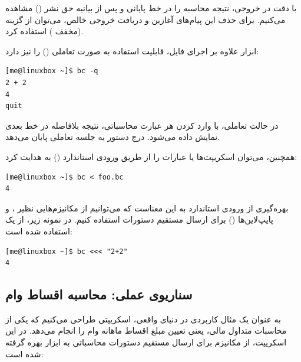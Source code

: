 با دقت در خروجی، نتیجه محاسبه را در خط پایانی و پس از بیانیه حق نشر () مشاهده می‌کنیم. برای حذف این پیام‌های آغازین و دریافت خروجی خالص، می‌توان از گزینه  (مخفف ) استفاده کرد.

ابزار  علاوه بر اجرای فایل، قابلیت استفاده به صورت تعاملی () را نیز دارد:

\begin{latin}
\begin{lstlisting}
[me@linuxbox ~]$ bc -q
2 + 2
4
quit
\end{lstlisting}
\end{latin}

در حالت تعاملی، با وارد کردن هر عبارت محاسباتی، نتیجه بلافاصله در خط بعدی نمایش داده می‌شود. درج دستور  به جلسه تعاملی پایان می‌دهد.

همچنین، می‌توان اسکریپت‌ها یا عبارات را از طریق ورودی استاندارد () به  هدایت کرد:

\begin{latin}
\begin{lstlisting}
[me@linuxbox ~]$ bc < foo.bc
4
\end{lstlisting}
\end{latin}

بهره‌گیری از ورودی استاندارد به این معناست که می‌توانیم از مکانیزم‌هایی نظیر ،  و پایپ‌لاین‌ها () برای ارسال مستقیم دستورات استفاده کنیم. در نمونه زیر، از یک  استفاده شده است:

\begin{latin}
\begin{lstlisting}
[me@linuxbox ~]$ bc <<< "2+2"
4
\end{lstlisting}
\end{latin}

\subsection{سناریوی عملی: محاسبه اقساط وام}

به عنوان یک مثال کاربردی در دنیای واقعی، اسکریپتی طراحی می‌کنیم که یکی از محاسبات متداول مالی، یعنی تعیین مبلغ اقساط ماهانه وام را انجام می‌دهد. در این اسکریپت، از مکانیزم  برای ارسال مستقیم دستورات محاسباتی به ابزار  بهره گرفته شده است:

